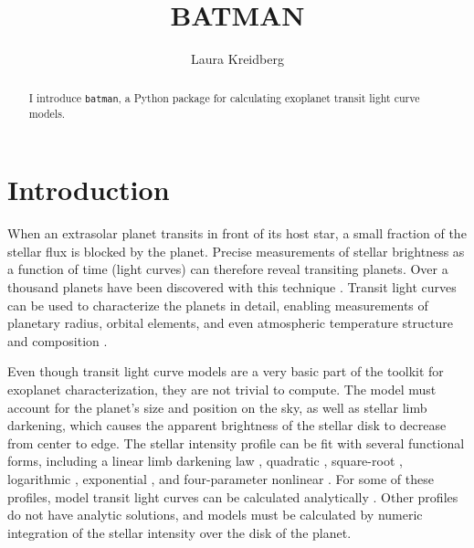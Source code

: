 \documentclass[12pt,preprint]{aastex}
\begin{document}
\title{BATMAN}

\author{Laura Kreidberg}



\begin{abstract}
I introduce \texttt{batman}, a Python package for calculating exoplanet transit light curve models.
\end{abstract}



\section{Introduction}
When an extrasolar planet transits in front of its host star, a small fraction of the stellar flux is blocked by the planet.  Precise measurements of stellar brightness as a function of time (light curves) can therefore reveal transiting planets. Over a thousand planets have been discovered with this technique \citep[e.g.][]{rowe2015}.  Transit light curves can be used to characterize the planets in detail, enabling measurements of planetary radius, orbital elements, and even atmospheric temperature structure and composition \citep{seager00, seager03}.  %

Even though transit light curve models are a very basic part of the toolkit for exoplanet characterization, they are not trivial to compute.  The model must account for the planet's size and position on the sky, as well as stellar limb darkening, which causes the apparent brightness of the stellar disk to decrease from center to edge.  The  stellar intensity profile can be fit with several functional forms, including a linear limb darkening law \citep{schwarzschild06}, quadratic \citep{kopal50}, square-root \citep{diaz-cordoves92}, logarithmic \citep{klinglesmith70}, exponential \citep{claret03}, and four-parameter nonlinear \citep{claret00}.  For some of these profiles, model transit light curves can be calculated analytically \citep{mandel02, gimenez06, abubekerov13}.  Other profiles do not have analytic solutions, and models must be calculated by numeric integration of the stellar intensity over the disk of the planet. 
\end{document}

